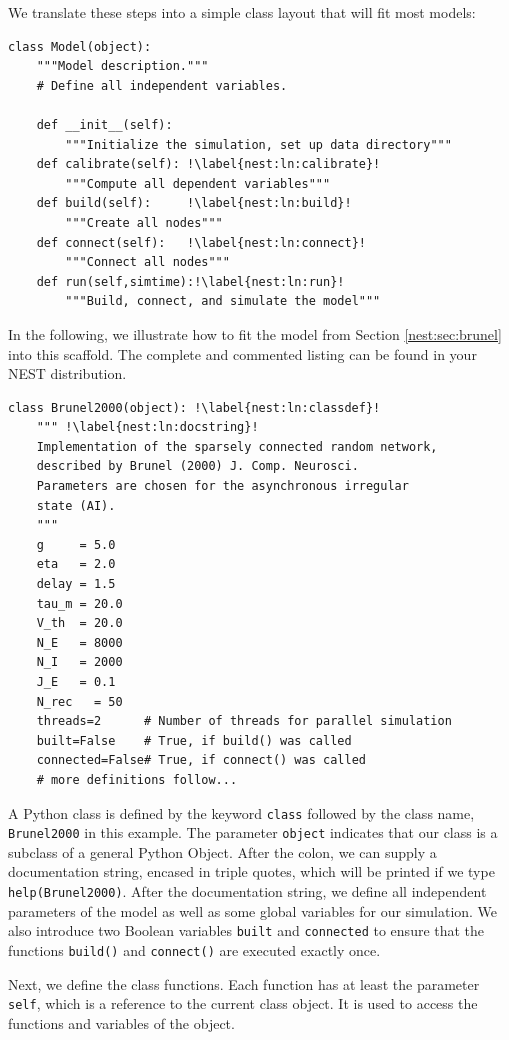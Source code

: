 \documentclass{article}
\begin{document}
We translate these steps into a simple class layout that will fit
most models:
\renewcommand*\thelstnumber{c\arabic{lstnumber}}
\begin{lstlisting}[name=classes]
class Model(object):
    """Model description."""
    # Define all independent variables.

    def __init__(self):
        """Initialize the simulation, set up data directory"""
    def calibrate(self): !\label{nest:ln:calibrate}!
        """Compute all dependent variables"""
    def build(self):     !\label{nest:ln:build}!
        """Create all nodes"""
    def connect(self):   !\label{nest:ln:connect}!
        """Connect all nodes"""
    def run(self,simtime):!\label{nest:ln:run}!
        """Build, connect, and simulate the model"""
\end{lstlisting}
In the following, we illustrate how to fit the model from Section
\ref{nest:sec:brunel} into this scaffold. The complete and commented
listing can be found in your NEST distribution.

\begin{lstlisting}[name=brunel-classes]
class Brunel2000(object): !\label{nest:ln:classdef}!
    """ !\label{nest:ln:docstring}!
    Implementation of the sparsely connected random network, 
    described by Brunel (2000) J. Comp. Neurosci.  
    Parameters are chosen for the asynchronous irregular
    state (AI).
    """
    g     = 5.0 
    eta   = 2.0
    delay = 1.5
    tau_m = 20.0
    V_th  = 20.0
    N_E   = 8000
    N_I   = 2000
    J_E   = 0.1
    N_rec   = 50
    threads=2      # Number of threads for parallel simulation
    built=False    # True, if build() was called
    connected=False# True, if connect() was called
    # more definitions follow...
\end{lstlisting}
A Python class is defined by the keyword \lstinline!class! followed by
the class name, \lstinline!Brunel2000! in this example. The parameter
\lstinline!object! indicates that our class is a subclass of a general
Python Object. After the colon, we can supply a documentation string,
encased in triple quotes, which will be printed if we type
\lstinline{help(Brunel2000)}.  After the documentation string, we
define all independent parameters of the model as well as some global
variables for our simulation. We also introduce two Boolean variables
\lstinline!built!  and \lstinline!connected! to ensure that the
functions \lstinline!build()! and \lstinline!connect()! are executed
exactly once.

Next, we define the class functions. Each function has at least the
parameter \lstinline!self!, which is a reference to the
current class object. It is used to access the functions and
variables of the object.
\end{document}
